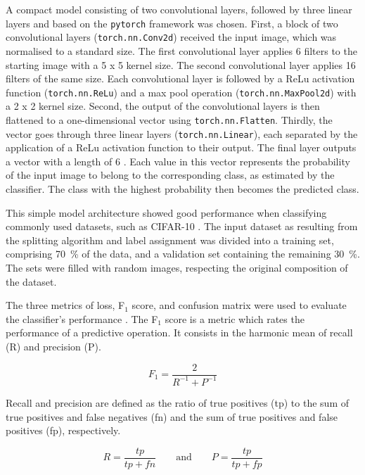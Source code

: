 A compact model consisting of two convolutional layers, followed by three linear layers and based on the \texttt{pytorch} \cite{NEURIPS2019_9015, pytorch} framework was chosen. First, a block of two convolutional layers (\texttt{torch.nn.Conv2d}) received the input image, which was normalised to a standard size. The first convolutional layer applies 6 filters to the starting image with a \num{5} x \num{5} kernel size. The second convolutional layer applies \num{16} filters of the same size. Each convolutional layer is followed by a ReLu activation function (\texttt{torch.nn.ReLu}) and a max pool operation (\texttt{torch.nn.MaxPool2d}) with a \num{2} x \num{2} kernel size. Second, the output of the convolutional layers is then flattened to a one-dimensional vector using \texttt{torch.nn.Flatten}. Thirdly, the vector goes through three linear layers (\texttt{torch.nn.Linear}), each separated by the application of a ReLu activation function to their output. The final layer outputs a vector with a length of \num{6} \cite{code}. Each value in this vector represents the probability of the input image to belong to the corresponding class, as estimated by the classifier. The class with the highest probability then becomes the predicted class.

This simple model architecture showed good performance when classifying commonly used datasets, such as CIFAR-10 \cite{NIPS2012_c399862d}. The input dataset as resulting from the splitting algorithm and label assignment was divided into a training set, comprising \qty{70}{\%} of the data, and a validation set containing the remaining \qty{30}{\%}. The sets were filled with random images, respecting the original composition of the dataset.

The three metrics of loss, F\(_1\) score, and confusion matrix were used to evaluate the classifier's performance \cite{grandini2020}. The F\(_1\) score is a metric which rates the performance of a predictive operation. It consists in the harmonic mean of recall (R) and precision (P).

\begin{equation}
    F_1=\frac{2}{R^{-1}+P^{-1}}
\end{equation}

Recall and precision are defined as the ratio of true positives (tp) to the sum of true positives and false negatives (fn) and the sum of true positives and false positives (fp), respectively.

\begin{equation}
    R=\frac{tp}{tp+fn}
        \quad\quad\text{and}\quad\quad
    P=\frac{tp}{tp+fp}
\end{equation}


